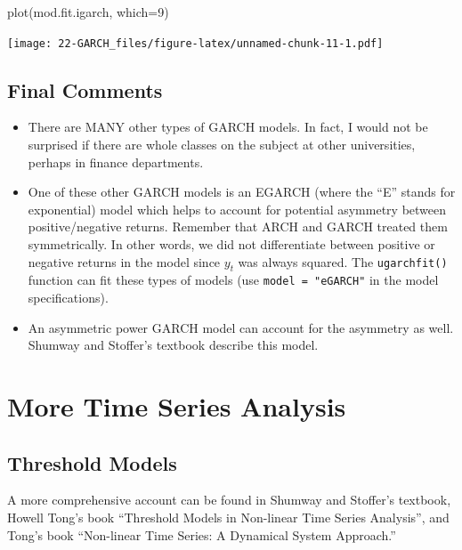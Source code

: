 \documentclass[
]{book}
\newenvironment{Shaded}{\begin{snugshade}}{\end{snugshade}}
\newcommand{\AttributeTok}[1]{\textcolor[rgb]{0.77,0.63,0.00}{#1}}
\newcommand{\DecValTok}[1]{\textcolor[rgb]{0.00,0.00,0.81}{#1}}
\newcommand{\FunctionTok}[1]{\textcolor[rgb]{0.00,0.00,0.00}{#1}}
\newcommand{\NormalTok}[1]{#1}
\providecommand{\tightlist}{%
  \setlength{\itemsep}{0pt}\setlength{\parskip}{0pt}}
\theoremstyle{definition}
\theoremstyle{definition}
\theoremstyle{definition}
\theoremstyle{definition}
\theoremstyle{remark}
\begin{document}
\begin{Shaded}
\begin{Highlighting}[]
\FunctionTok{plot}\NormalTok{(mod.fit.igarch, }\AttributeTok{which=}\DecValTok{9}\NormalTok{)}
\end{Highlighting}
\end{Shaded}

\texttt{[image: 22-GARCH\_files/figure-latex/unnamed-chunk-11-1.pdf]}

\hypertarget{final-comments}{%
\section{Final Comments}\label{final-comments}}

\begin{itemize}
\tightlist
\item
  There are MANY other types of GARCH models. In fact, I would not be surprised if there are whole classes on the subject at other universities, perhaps in finance departments.
\item
  One of these other GARCH models is an EGARCH (where the ``E'' stands for exponential) model which helps to account for potential asymmetry between positive/negative returns. Remember that ARCH and GARCH treated them symmetrically. In other words, we did not differentiate between positive or negative returns in the model since \(y_t\) was always squared. The \texttt{ugarchfit()} function can fit these types of models (use \texttt{model\ =\ "eGARCH"} in the model specifications).
\item
  An asymmetric power GARCH model can account for the asymmetry as well. Shumway and Stoffer's textbook describe this model.
\end{itemize}

\hypertarget{more-time-series-analysis}{%
\chapter{More Time Series Analysis}\label{more-time-series-analysis}}

\hypertarget{threshold-models}{%
\section{Threshold Models}\label{threshold-models}}

A more comprehensive account can be found in Shumway and Stoffer's textbook, Howell Tong's book ``Threshold Models in Non-linear Time Series Analysis'', and Tong's book ``Non-linear Time Series: A Dynamical System Approach.''
\end{document}
